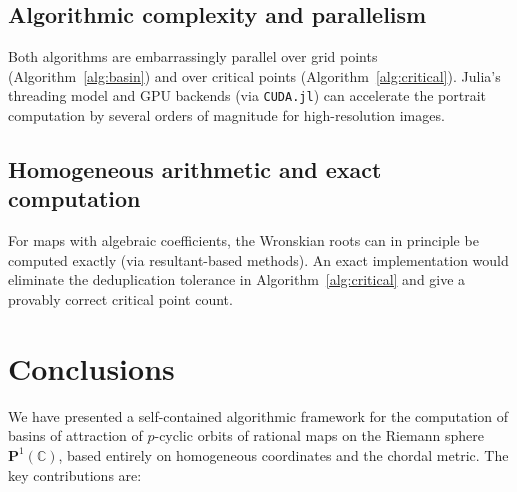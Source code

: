 \documentclass[12pt]{article}
\theoremstyle{definition}
\newcommand{\C}{\mathbb{C}}
\newcommand{\Pone}{\mathbf{P}^1(\C)}
\begin{document}
\subsection{Algorithmic complexity and parallelism}

Both algorithms are embarrassingly parallel over grid points
(Algorithm~\ref{alg:basin}) and over critical points
(Algorithm~\ref{alg:critical}).  Julia's threading model and
GPU backends (via \texttt{CUDA.jl}) can accelerate the portrait
computation by several orders of magnitude for high-resolution images.

\subsection{Homogeneous arithmetic and exact computation}

For maps with algebraic coefficients, the Wronskian roots can in principle
be computed exactly (via resultant-based methods).  An exact
implementation would eliminate the deduplication tolerance in
Algorithm~\ref{alg:critical} and give a provably correct critical point
count.

\section{Conclusions}
\label{sec:conclusions}

We have presented a self-contained algorithmic framework for the computation
of basins of attraction of $p$-cyclic orbits of rational maps on the Riemann
sphere $\Pone$, based entirely on homogeneous coordinates and the chordal
metric.  The key contributions are:
\end{document}
